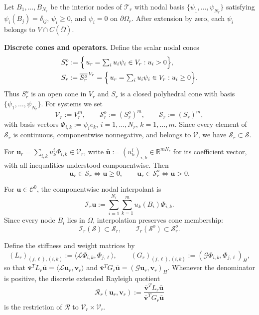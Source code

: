 \documentclass[preprint,10pt]{elsarticle}
\theoremstyle{plain}
\theoremstyle{definition}
\theoremstyle{remark}
\begin{document}
Let $B_1,\ldots,B_{N_r}$ be the interior nodes of $\mathcal{T}_r$ with nodal
basis $\{\psi_1,\ldots,\psi_{N_r}\}$ satisfying $\psi_i(B_j)=\delta_{ij}$,
$\psi_i\ge0$, and $\psi_i=0$ on $\partial\Omega_r$. After extension by zero,
each $\psi_i$ belongs to $V\cap C(\overline\Omega)$.

\medskip

\noindent\textbf{Discrete cones and operators.}\;
Define the scalar nodal cones
\begin{align*}
	&S_r^o
	:= \Bigl\{\,u_r=\textstyle\sum_i u_i\psi_i\in V_r : u_i>0\Bigr\},
	\\
	&S_r
	:= \overline{S_r^o}^{\,V_r}
	= \Bigl\{\,u_r=\textstyle\sum_i u_i\psi_i\in V_r : u_i\ge0\Bigr\}.
\end{align*}
Thus $S_r^o$ is an open cone in $V_r$ and $S_r$ is a closed polyhedral cone
with basis $\{\psi_1,\ldots,\psi_{N_r}\}$. For systems we set
\[
\mathcal{V}_r := V_r^m, \qquad
\mathcal{S}_r^o := (S_r^o)^m, \qquad
\mathcal{S}_r := (S_r)^m,
\]
with basis vectors $\Phi_{i,k}:=\psi_i e_k$, $i=1,\ldots,N_r$,
$k=1,\ldots,m$. Since every element of $\mathcal{S}_r$ is continuous,
componentwise nonnegative, and belongs to $\mathcal{V}$, we have
$\mathcal{S}_r\subset\mathcal{S}$.

\medskip

For $\mathbf{u}_r=\sum_{i,k}u_k^i\Phi_{i,k}\in\mathcal{V}_r$, write
$\bar{\mathbf{u}}:=(u_k^i)_{i,k}\in\mathbb{R}^{mN_r}$ for its coefficient
vector, with all inequalities understood componentwise. Then
\[
\mathbf{u}_r\in\mathcal{S}_r \Longleftrightarrow \bar{\mathbf{u}}\ge0,
\qquad
\mathbf{u}_r\in\mathcal{S}_r^o \Longleftrightarrow \bar{\mathbf{u}}>0.
\]

For $\mathbf{u}\in\mathcal{C}^0$, the componentwise nodal interpolant is
\[
\mathcal{I}_r\mathbf{u}
:= \sum_{i=1}^{N_r}\sum_{k=1}^m u_k(B_i)\Phi_{i,k}.
\]
Since every node $B_i$ lies in $\Omega$, interpolation preserves cone membership:
\begin{equation}\label{eq:positive-interpolation}
	\mathcal{I}_r(\mathcal{S})\subset\mathcal{S}_r,
	\qquad
	\mathcal{I}_r(\mathcal{S}^o)\subset\mathcal{S}_r^o.
\end{equation}

Define the stiffness and weight matrices by
\[
(L_r)_{(j,\ell),(i,k)}
:= \langle\mathcal{L}\Phi_{i,k},\Phi_{j,\ell}\rangle,
\qquad
(G_r)_{(j,\ell),(i,k)}
:= (\mathcal{G}\Phi_{i,k},\Phi_{j,\ell})_H,
\]
so that $\bar{\mathbf{v}}^T L_r\bar{\mathbf{u}}=\langle\mathcal{L}\mathbf{u}_r,
\mathbf{v}_r\rangle$ and $\bar{\mathbf{v}}^T G_r\bar{\mathbf{u}}=
(\mathcal{G}\mathbf{u}_r,\mathbf{v}_r)_H$. Whenever the denominator is positive,
the discrete extended Rayleigh quotient
\begin{equation}\label{eq:discrete-Rayleigh}
	\mathcal{R}_r(\mathbf{u}_r,\mathbf{v}_r)
	:= \frac{\bar{\mathbf{v}}^T L_r\bar{\mathbf{u}}}
	{\bar{\mathbf{v}}^T G_r\bar{\mathbf{u}}}
\end{equation}
is the restriction of $\mathcal{R}$ to $\mathcal{V}_r\times\mathcal{V}_r$.
\end{document}
